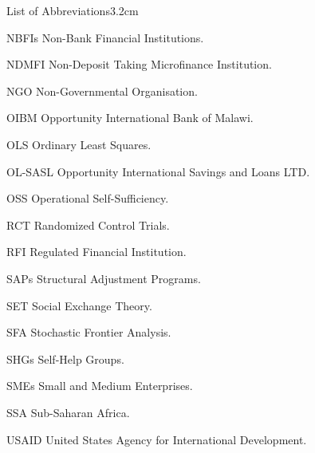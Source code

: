 \begin{mclistof}{List of Abbreviations}{3.2cm}
\item[NBFIs] Non-Bank Financial Institutions.

\item[NDMFI] Non-Deposit Taking Microfinance Institution.

\item[NGO] Non-Governmental Organisation.

\item[OIBM] Opportunity International Bank of Malawi.

\item[OLS] Ordinary Least Squares.

\item[OL-SASL] Opportunity International Savings and Loans LTD.

\item[OSS] Operational Self-Sufficiency.

\item[RCT] Randomized Control Trials.

\item[RFI] Regulated Financial Institution.

\item[SAPs] Structural Adjustment Programs.

\item[SET] Social Exchange Theory.

\item[SFA] Stochastic Frontier Analysis.

\item[SHGs] Self-Help Groups.

\item[SMEs] Small and Medium Enterprises.

\item[SSA] Sub-Saharan Africa.

\item[USAID] United States Agency for International Development.

\end{mclistof} 
